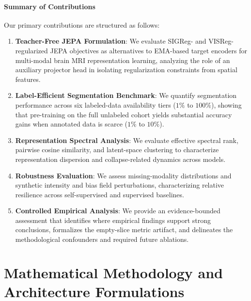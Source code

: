 \documentclass{article}
\begin{document}
\paragraph{Summary of Contributions}
Our primary contributions are structured as follows:
\begin{enumerate}
    \item \textbf{Teacher-Free JEPA Formulation}: We evaluate SIGReg- and VISReg-regularized JEPA objectives as alternatives to EMA-based target encoders for multi-modal brain MRI representation learning, analyzing the role of an auxiliary projector head in isolating regularization constraints from spatial features.
    \item \textbf{Label-Efficient Segmentation Benchmark}: We quantify segmentation performance across six labeled-data availability tiers ($1\%$ to $100\%$), showing that pre-training on the full unlabeled cohort yields substantial accuracy gains when annotated data is scarce ($1\%$ to $10\%$).
    \item \textbf{Representation Spectral Analysis}: We evaluate effective spectral rank, pairwise cosine similarity, and latent-space clustering to characterize representation dispersion and collapse-related dynamics across models.
    \item \textbf{Robustness Evaluation}: We assess missing-modality distributions and synthetic intensity and bias field perturbations, characterizing relative resilience across self-supervised and supervised baselines.
    \item \textbf{Controlled Empirical Analysis}: We provide an evidence-bounded assessment that identifies where empirical findings support strong conclusions, formalizes the empty-slice metric artifact, and delineates the methodological confounders and required future ablations.
\end{enumerate}


\section{Mathematical Methodology and Architecture Formulations}
\end{document}
